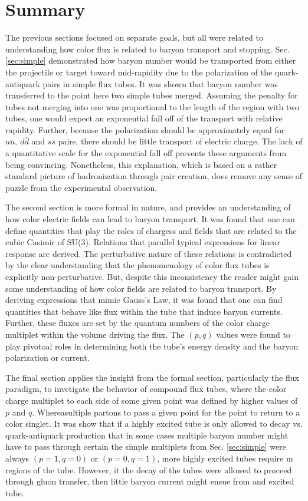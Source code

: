 \documentclass[aps, prc, 12pt, nofootinbib, showpacs, superscriptaddress, tightenlines, groupedaddress]{revtex4-2}
\begin{document}
\section{Summary}
The previous sections focused on separate goals, but all were related to understanding how color flux is related to baryon transport and stopping. Sec. \ref{sec:simple} demonstrated how baryon number would be transported from either the projectile or target toward mid-rapidity due to the polarization of the quark-antiquark pairs in simple flux tubes. It was shown that baryon number was transferred to the point here two simple tubes merged. Assuming the penalty for tubes not merging into one was proportional to the length of the region with two tubes, one would expect an exponential fall off of the transport with relative rapidity. Further, because the polarization should be approximately equal for $u\bar{u},~d\bar{d}$ and $s\bar{s}$ pairs, there should be little transport of electric charge. The lack of a quantitative scale for the exponential fall off prevents these arguments from being convincing. Nonetheless, this explanation, which is based on a rather standard picture of hadronization through pair creation, does remove any sense of puzzle from the experimental observation.

The second section is more formal in nature, and provides an understanding of how color electric fields can lead to baryon transport. It was found that one can define quantities that play the roles of chargess and fields that are related to the cubic Casimir of SU(3). Relations that parallel typical expressions for linear response are derived. The perturbative nature of these relations is contradicted by the clear understanding that the phenomenology of color flux tubes is explicitly non-perturbative. But, despite this inconsistency the reader might gain some understanding of how color fields are related to baryon transport. By deriving expressions that mimic Gauss's Law, it was found that one can find quantities that behave like flux within the tube that induce baryon currents. Further, these fluxes are set by the quantum numbers of the color charge multiplet within the volume driving the flux. The $(p,q)$ values were found to play pivotoal roles in determining both the tube's energy density and the baryon polarization or current.

The final section applies the insight from the formal section, particularly the flux paradigm, to invetigate the behavior of compound flux tubes, where the color charge multiplet to each side of some given point was defined by higher values of $p$ and $q$. Whereasultiple partons to pass a given point for the point to return to a color singlet. It was show that if a highly excited tube is only allowed to decay vs. quark-antiquark production that in some cases multiple baryon number might have to pass through certain the simple multiplets from Sec. \ref{sec:simple} were always $(p=1,q=0)$ or $(p=0,q=1)$, more highly excited tubes require m regions of the tube. However, it the decay of the tubes were allowed to proceed through gluon transfer, then little baryon current might ensue from and excited tube.
\end{document}

